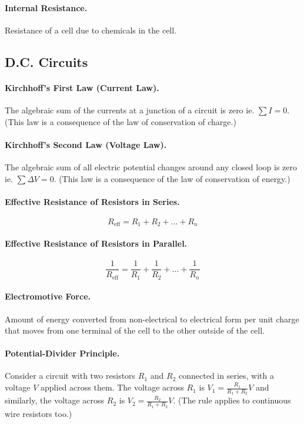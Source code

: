 \documentclass{article}
\begin{document}
\paragraph{Internal Resistance.} Resistance of a cell due to chemicals in the
cell.

\subsection{D.C. Circuits}

\paragraph{Kirchhoff's First Law (Current Law).} The algebraic sum of the
currents at a junction of a circuit is zero ie. $\sum I = 0$. (This law is a
consequence of the law of conservation of charge.)

\paragraph{Kirchhoff's Second Law (Voltage Law).} The algebraic sum of all
electric potential changes around any closed loop is zero ie. $\sum \Delta V =
0$. (This law is a consequence of the law of conservation of energy.)

\paragraph{Effective Resistance of Resistors in Series.} \begin{equation}
R_{\text{eff}} = R_1 + R_2 + \ldots + R_n \end{equation}

\paragraph{Effective Resistance of Resistors in Parallel.} \begin{equation}
\frac{1}{R_{\text{eff}}} = \frac{1}{R_1} + \frac{1}{R_2} + \ldots +
\frac{1}{R_n} \end{equation}

\paragraph{Electromotive Force.} Amount of energy converted from non-electrical
to electrical form per unit charge that moves from one terminal of the cell to
the other outside of the cell.

\paragraph{Potential-Divider Principle.} Consider a circuit with two resistors
$R_1$ and $R_2$ connected in series, with a voltage $V$ applied across them. The
voltage across $R_1$ is $V_1 = \frac{R_1}{R_1 + R_2}V$ and similarly, the
voltage across $R_2$ is $V_2 = \frac{R_2}{R_1 + R_2}V$. (The rule applies to
continuous wire resistors too.)
\end{document}
